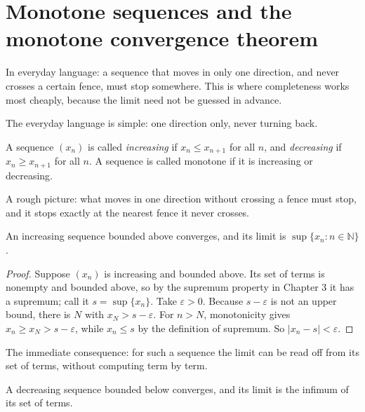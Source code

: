 \section{Monotone sequences and the monotone convergence theorem}

In everyday language: a sequence that moves in only one direction, and never crosses
a certain fence, must stop somewhere. This is where completeness works most cheaply,
because the limit need not be guessed in advance.


The everyday language is simple: one direction only, never turning back.

\begin{definisi}
A sequence $(x_n)$ is called \emph{increasing} if
$x_n \le x_{n+1}$ for all $n$, and \emph{decreasing} if $x_n \ge x_{n+1}$ for all
$n$. A sequence is called monotone if it is increasing or decreasing.
\end{definisi}

A rough picture: what moves in one direction without crossing a fence must stop, and
it stops exactly at the nearest fence it never crosses.

\begin{teorema}
An increasing sequence bounded above converges, and its limit is
$\sup\{x_n : n \in \mathbb{N}\}$.
\end{teorema}

\begin{proof}
Suppose $(x_n)$ is increasing and bounded above. Its set of terms is nonempty and
bounded above, so by the supremum property in Chapter 3 it has a supremum; call it
$s=\sup\{x_n\}$. Take $\varepsilon>0$. Because $s-\varepsilon$ is not an upper bound,
there is $N$ with $x_N>s-\varepsilon$. For $n>N$, monotonicity gives
$x_n \ge x_N>s-\varepsilon$, while $x_n \le s$ by the definition of supremum. So
$|x_n-s|<\varepsilon$.
\end{proof}

The immediate consequence: for such a sequence the limit can be read off from its set
of terms, without computing term by term.

\begin{akibat}
A decreasing sequence bounded below converges, and its limit is the infimum of its
set of terms.
\end{akibat}

